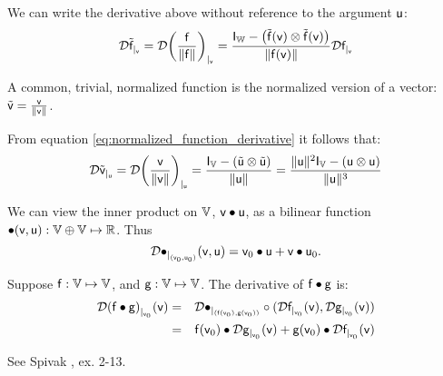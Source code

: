 We can write the derivative above without reference to the argument $\mathsf{u}$:
\begin{equation}
\label{eq:normalized_function_derivative}
{\mathcal{D}{\tilde{\mathsf{f}}}_{\mid_{\mathsf{v}}}}
 =
{\mathcal{D}{\left( \frac{\mathsf{f}}{\| \mathsf{f} \|} \right)}_{\mid_{\mathsf{v}}}}
 =
\frac{\mathsf{I}_{\mathbb{W}} - \left( \tilde{\mathsf{f}}(\mathsf{v}) \otimes \tilde{\mathsf{f}}(\mathsf{v}) \right) }
{ \| \mathsf{f}(\mathsf{v}) \| }
{\mathcal{D}{\mathsf{f}}_{\mid_{\mathsf{v}}}}
\end{equation}

A common, trivial, normalized function is the normalized version of
a vector: $\tilde{\mathsf{v}} =  \frac{\mathsf{v}}{ \| \mathsf{v} \| }$.

From equation \ref{eq:normalized_function_derivative}
it follows that:
\begin{equation}
\label{eq:normalized_vector_derivative}
{\mathcal{D}{\tilde{\mathsf{v}}}_{\mid_{\mathsf{u}}}}
 =
{\mathcal{D}{ \left( \frac{\mathsf{v}}{ \| \mathsf{v} \| } \right) }_{\mid_{\mathsf{u}}}}
 =
\frac{\mathsf{I}_{\mathbb{V}} - \left( \tilde{\mathsf{u}} \otimes \tilde{\mathsf{u}} \right) }
{ \| \mathsf{u} \| }
 =
\frac{\| \mathsf{u} \|^2 \mathsf{I}_{\mathbb{V}} - \left( \mathsf{u} \otimes \mathsf{u} \right) }
{\| \mathsf{u} \|^3}
\end{equation}

\label{sec:Real-valued-functions}

\label{sec:Inner-products}

We can view the inner product on $\mathbb{V}$, $\mathsf{v} \bullet \mathsf{u}$,
as a bilinear function $\bullet(\mathsf{v},\mathsf{u}) : \mathbb{V} \oplus \mathbb{V} \mapsto \mathbb{R}$.
Thus
\begin{equation}
{\mathcal{D}{\bullet}_{\mid_{(\mathsf{v}_0,\mathsf{u}_0)}}({\mathsf{v},\mathsf{u}})} = \mathsf{v}_0 \bullet \mathsf{u} + \mathsf{v} \bullet \mathsf{u}_0.
\end{equation}

Suppose
$\mathsf{f}:\mathbb{V} \mapsto \mathbb{V}$, and
$\mathsf{g}:\mathbb{V} \mapsto \mathbb{V}$.
The derivative of $\mathsf{f} \bullet \mathsf{g}$ is:
\begin{eqnarray}
\label{eq:dot_derivative}
{\mathcal{D}{(\mathsf{f}\bullet \mathsf{g})}_{\mid_{\mathsf{v}_0}}({\mathsf{v}})}
& =
& {\mathcal{D}{\bullet}_{\mid_{(\mathsf{f}(\mathsf{v}_0),\mathsf{g}(\mathsf{v}_0))}}} \circ ({\mathcal{D}{\mathsf{f}}_{\mid_{\mathsf{v}_0}}({\mathsf{v}})}, {\mathcal{D}{\mathsf{g}}_{\mid_{\mathsf{v}_0}}({\mathsf{v}})})
\\
& =
& \mathsf{f}(\mathsf{v}_0) \bullet {\mathcal{D}{\mathsf{g}}_{\mid_{\mathsf{v}_0}}({\mathsf{v}})}  +  \mathsf{g}(\mathsf{v}_0) \bullet {\mathcal{D}{\mathsf{f}}_{\mid_{\mathsf{v}_0}}({\mathsf{v}})} \nonumber
\end{eqnarray}

See Spivak \cite{spivak-1965}, ex. 2-13.

\label{sec:Angles}

